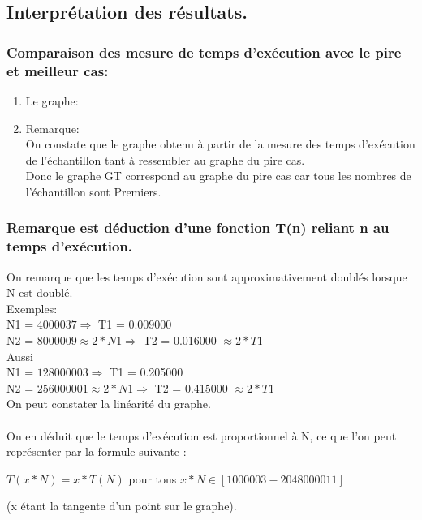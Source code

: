 \documentclass[12pt]{article}
\begin{document}
\subsection{Interprétation des résultats.}
\subsubsection{Comparaison des mesure de temps d'exécution avec le pire et meilleur cas:}
\begin{enumerate}
	\item Le graphe:
	\\

	\item Remarque:
	\\
	On constate que le graphe obtenu à partir de la mesure des temps d'exécution de l'échantillon tant à ressembler au graphe du pire cas.
	\\
	Donc le graphe GT correspond au graphe du pire cas car tous les nombres de l'échantillon sont Premiers.
	
\end{enumerate}

\subsubsection{Remarque est déduction d'une fonction T(n) reliant n au temps d'exécution.}


On remarque que les temps d'exécution sont approximativement doublés lorsque N est doublé.
\\

\color{blue}
Exemples:
\color{black} 
\\
N1 = $4000037  \Rightarrow  $  T1 = 0.009000
\\
N2 = $8000009 \approx 2 * N1  \Rightarrow  $  T2 = 0.016000 $\approx 2 * T1 $
\\

Aussi
\\
N1 = $128000003 \Rightarrow $  T1 = 0.205000
\\
N2 = $256000001 \approx 2 * N1 \Rightarrow $  T2 = 0.415000 $\approx 2 * T1 $
\\

On peut constater la linéarité du graphe. 
\\
\\
On en déduit que le temps d'exécution est proportionnel à N, ce que l'on peut représenter par la formule suivante
: 
\begin{center}

	$T(x*N) = x*T(N)$ pour tous $ x*N \in [1000003 - 2048000011] $	
	

(x étant la tangente d'un point sur le graphe).
\end{center}
\end{document}
